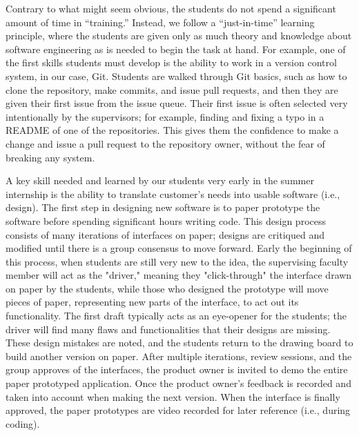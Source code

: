 Contrary to what might seem obvious, the students do not spend a significant amount of time in ``training.'' Instead, we follow a ``just-in-time'' learning principle, where the students are given only as much theory and knowledge about software engineering as is needed to begin the task at hand. For example, one of the first skills students must develop is the ability to work in a version control system, in our case, Git. Students are walked through Git basics, such as how to clone the repository, make commits, and issue pull requests, and then they are given their first issue from the issue queue. Their first issue is often selected very intentionally by the supervisors; for example, finding and fixing a typo in a README of one of the repositories. This gives them the confidence to make a change and issue a pull request to the repository owner, without the fear of breaking any system. 


A key skill needed and learned by our students very early in the summer internship is the ability to translate customer's needs into usable software (i.e., design). The first step in designing new software is to paper prototype \cite{2003paperPrototype} the software before spending significant hours writing code. This design process consists of many iterations of interfaces on paper; designs are critiqued and modified until there is a group consensus to move forward. Early the beginning of this process, when students are still very new to the idea, the supervising faculty member will act as the "driver," meaning they "click-through" the interface drawn on paper by the students, while those who designed the prototype will move pieces of paper, representing new parts of the interface, to act out its functionality. The first draft typically acts as an eye-opener for the students; the driver will find many flaws and functionalities that their designs are missing. These design mistakes are noted, and the students return to the drawing board to build another version on paper. After multiple iterations, review sessions, and the group approves of the interfaces, the product owner is invited to demo the entire paper prototyped application. Once the product owner's feedback is recorded and taken into account when making the next version. When the interface is finally approved, the paper prototypes are video recorded for later reference (i.e., during coding). 

